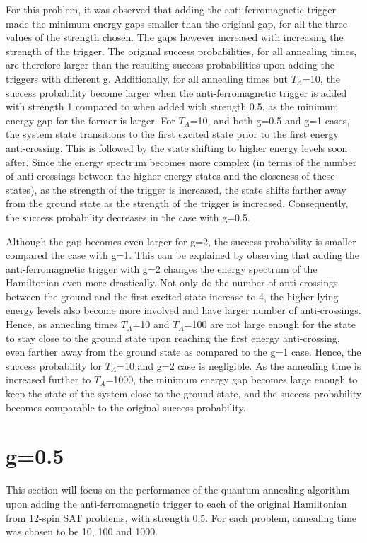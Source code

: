\documentclass[12]{article}
\begin{document}
For this problem, it was observed that adding the anti-ferromagnetic trigger made the minimum energy gaps smaller than the original gap, for all the three values of the strength chosen. The gaps however increased with increasing the strength of the trigger. The original success probabilities, for all annealing times, are therefore larger than the resulting success probabilities upon adding the triggers with different g. Additionally, for all annealing times but $T_A$=10, the success probability become larger when the anti-ferromagnetic trigger is added with strength 1 compared to when added with strength 0.5, as the minimum energy gap for the former is larger. For $T_A$=10, and both g=0.5 and g=1 cases, the system state transitions to the first excited state prior to the first energy anti-crossing. This is followed by the state shifting to higher energy levels soon after. Since the energy spectrum becomes more complex (in terms of the number of anti-crossings between the higher energy states and the closeness of these states), as the strength of the trigger is increased, the state shifts farther away from the ground state as the strength of the trigger is increased. Consequently, the success probability decreases in the case with g=0.5.

 Although the gap becomes even larger for g=2, the success probability is smaller compared the case with g=1. This can be explained by observing that adding the anti-ferromagnetic trigger with g=2 changes the energy spectrum of the Hamiltonian even more drastically. Not only do the number of anti-crossings between the ground and the first excited state increase to 4, the higher lying energy levels also become more involved and have larger number of anti-crossings. Hence, as annealing times $T_A$=10 and $T_A$=100 are not large enough for the state to stay close to the ground state upon reaching the first energy anti-crossing, even farther away from the ground state as compared to the g=1 case. Hence, the success probability for $T_A$=10 and g=2 case is negligible. As the annealing time is increased further to $T_A$=1000, the minimum energy gap becomes large enough to keep the state of the system close to the ground state, and the success probability becomes comparable to the original success probability.
 
 
\section*{g=0.5}
This section will focus on the performance of the quantum annealing algorithm upon adding the anti-ferromagnetic trigger to each of the original Hamiltonian from 12-spin SAT problems, with strength 0.5. For each problem, annealing time was chosen to be 10, 100 and 1000. 
\end{document}
